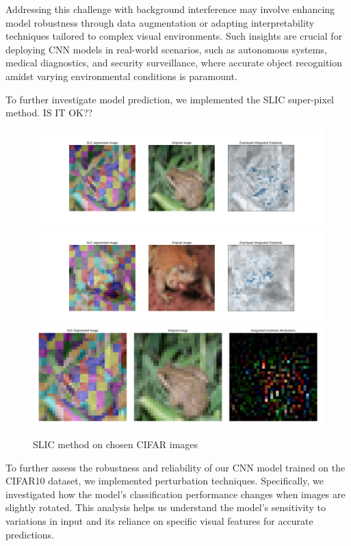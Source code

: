 \documentclass[journal, a4paper]{IEEEtran}
\begin{document}
Addressing this challenge with background interference may involve enhancing model robustness through data augmentation or adapting interpretability techniques tailored to complex visual environments.
Such insights are crucial for deploying CNN models in real-world scenarios, such as autonomous systems, medical diagnostics, and security surveillance, where accurate object recognition amidst varying environmental conditions is paramount.

To further investigate model prediction, we implemented the SLIC super-pixel method.
IS IT OK??
\begin{figure}[ht]\centering
    \includegraphics[width=.6\linewidth]{img/SLIC/cifar/img_5}
    \includegraphics[width=.6\linewidth]{img/SLIC/cifar/img_6}
    \includegraphics[width=.6\linewidth]{img/SLIC/cifar/img_9}
    \caption{SLIC method on chosen CIFAR images}\label{fig:cifar-cnn-slic}
\end{figure}

To further assess the robustness and reliability of our CNN model trained on the CIFAR10 dataset, we implemented perturbation techniques.
Specifically, we investigated how the model's classification performance changes when images are slightly rotated.
This analysis helps us understand the model's sensitivity to variations in input and its reliance on specific visual features for accurate predictions.
\end{document}
